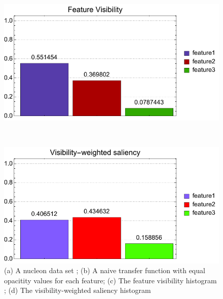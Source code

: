 \begin{figure}
\begin{minipage}{.15\textwidth}
	\subcaption{}
\end{minipage}~
\begin{minipage}{.25\textwidth}
	\includegraphics[width=1\linewidth]{figures/nucleon_naive_visibility_chart}
	\subcaption{}
\end{minipage}~
\begin{minipage}{.25\textwidth}
	\includegraphics[width=1\linewidth]{figures/nucleon_naive_visibility_saliency_weighted_chart}
	\subcaption{}
\end{minipage}
\caption[A nucleon data set with a naive transfer function]{(a) A nucleon data set \cite{website:Voreen_datasets_2013}; (b) A naive transfer function with equal opacitity values for each feature; (c) The feature visibility histogram \cite{wang_efficient_2011}; (d) The visibility-weighted saliency histogram}
\label{fig:nucleon_naive}
\end{figure}

